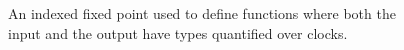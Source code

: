 \begin{figure}
%
\caption{An indexed fixed point used to define functions where both the input
  and the output have types quantified over clocks.}
\label{fig:pfix}
\end{figure}


